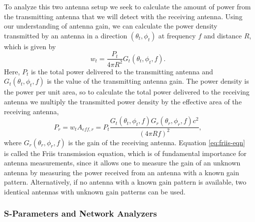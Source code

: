 To analyze this two antenna setup we seek to calculate the amount of power from the transmitting antenna that we will detect with the receiving antenna. Using our understanding of antenna gain, we can calculate the power density transmitted by an antenna in a direction $(\theta_t,\phi_t)$ at frequency $f$ and distance $R$, which is given by
\begin{equation}
    w_t = \frac{P_t}{4\pi R^2}G_t(\theta_t,\phi_t,f).
\end{equation}
Here, $P_t$ is the total power delivered to the transmitting antenna and $G_t(\theta_t,\phi_t,f)$ is the value of the transmitting antenna gain. The power density is the power per unit area, so to calculate the total power delivered to the receiving antenna we multiply the transmitted power density by the effective area of the receiving antenna,
\begin{equation}
    P_r = w_tA_{eff,r}=P_t\frac{G_t(\theta_t,\phi_t,f)G_r(\theta_r,\phi_r,f)c^2}{(4\pi Rf)^2},
    \label{eq:friis-eqn}
\end{equation}
where $G_r(\theta_r,\phi_r,f)$ is the gain of the receiving antenna. Equation \ref{eq:friis-eqn} is called the Friis transmission equation, which is of fundamental importance for antenna measurements, since it allows one to measure the gain of an unknown antenna by measuring the power received from an antenna with a known gain pattern. Alternatively, if no antenna with a known gain pattern is available, two identical antennas with unknown gain patterns can be used.

\subsubsection{S-Parameters and Network Analyzers}

